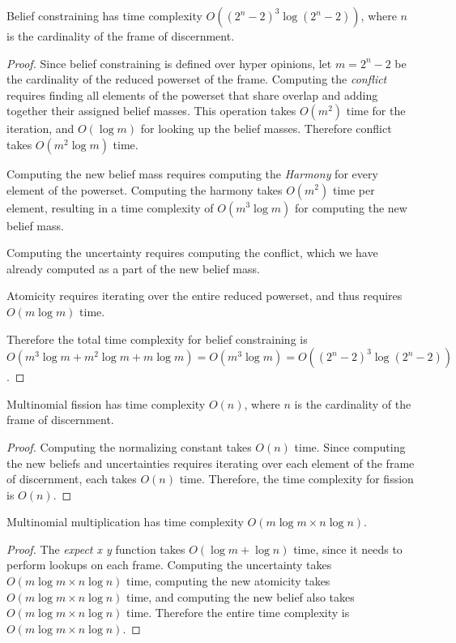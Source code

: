 \documentclass[thesis.tex]{subfiles}
\begin{document}
\begin{theorem}
  Belief constraining has time complexity $O ((2^n - 2)^3 \log (2^n - 2))$,
  where $n$ is the cardinality of the frame of discernment.
\end{theorem}

\begin{proof}
  Since belief constraining is defined over hyper opinions, let $m = 2^n - 2$ be the cardinality
  of the reduced powerset of the frame. Computing the \emph{conflict} requires finding all elements of
  the powerset that share overlap and adding together their assigned belief masses. This operation
  takes $O (m^2)$ time for the iteration, and $O (\log m)$ for looking up the belief masses. Therefore
  conflict takes $O (m^2 \log m)$ time.

  Computing the new belief mass requires computing the \emph{Harmony} for every element of the powerset.
  Computing the harmony takes $O (m^2)$ time per element, resulting in a time complexity of $O (m^3 \log m)$
  for computing the new belief mass.

  Computing the uncertainty requires computing the conflict, which we have already computed as a part of
  the new belief mass.

  Atomicity requires iterating over the entire reduced powerset, and thus requires $O (m \log m)$ time.

  Therefore the total time complexity for belief constraining is
  $O (m^3 \log m + m^2 \log m + m \log m) = O (m^3 \log m) = O ((2^n - 2)^3 \log (2^n - 2))$.
\end{proof}

\begin{theorem}
  Multinomial fission has time complexity $O (n)$, where $n$ is the cardinality of the frame of discernment.
\end{theorem}

\begin{proof}
  Computing the normalizing constant takes $O (n)$ time. Since computing the new beliefs and uncertainties
  requires iterating over each element of the frame of discernment, each takes $O (n)$ time. Therefore, the
  time complexity for fission is $O (n)$.
\end{proof}

\begin{theorem}
  Multinomial multiplication has time complexity $O (m \log m \times n \log n)$.
\end{theorem}

\begin{proof}
  The \emph{expect x y} function takes $O (\log m + \log n)$ time, since it needs to perform
  lookups on each frame. Computing the uncertainty takes $O (m \log m \times n \log n)$ time,
  computing the new atomicity takes $O (m \log m \times n \log n)$ time, and computing the new
  belief also takes $O (m \log m \times n \log n)$ time. Therefore the entire time complexity is
  $O (m \log m \times n \log n)$.
\end{proof}
\end{document}
